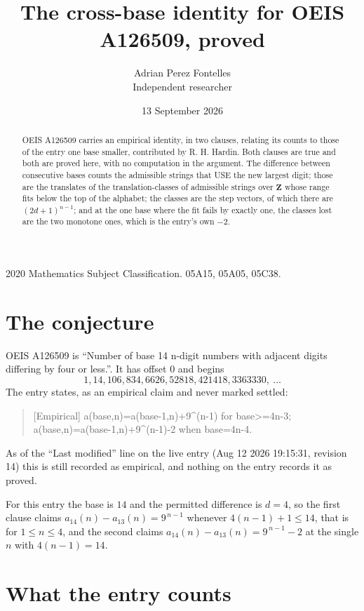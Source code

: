 \documentclass[11pt,a4paper]{article}
\title{The cross-base identity for OEIS A126509, proved}
\author{Adrian Perez Fontelles\\ \small Independent researcher}
\date{13 September 2026}
\theoremstyle{plain}
\theoremstyle{definition}
\begin{document}
\maketitle

\begin{abstract}
OEIS A126509 carries an empirical identity, in two clauses, relating its counts to those of the
entry one base smaller, contributed by R. H. Hardin. Both clauses are true and both are proved
here, with no computation in the argument. The difference between consecutive bases counts the
admissible strings that USE the new largest digit; those are the translates of the
translation-classes of admissible strings over $\mathbf{Z}$ whose range fits below the top of
the alphabet; the classes are the step vectors, of which there are $(2d+1)^{n-1}$; and at the
one base where the fit fails by exactly one, the classes lost are the two monotone ones, which
is the entry's own $-2$.
\end{abstract}

\noindent\small 2020 Mathematics Subject Classification. 05A15, 05A05, 05C38.\normalsize

\section{The conjecture}

OEIS A126509 is ``Number of base 14 n-digit numbers with adjacent digits differing by four or less.''. It has offset $0$ and begins
\[
1, 14, 106, 834, 6626, 52818, 421418, 3363330,\ \dots
\]
The entry states, as an empirical claim and never marked settled:
\begin{quote}
[Empirical] a(base,n)=a(base-1,n)+9\textasciicircum{}(n-1) for base>=4n-3; a(base,n)=a(base-1,n)+9\textasciicircum{}(n-1)-2 when base=4n-4.
\end{quote}
As of the ``Last modified'' line on the live entry (Aug 12 2026 19:15:31, revision 14)
this is still recorded as empirical, and nothing on the entry records it as proved.

For this entry the base is $14$ and the permitted difference is $d=4$, so the first clause
claims $a_{14}(n)-a_{13}(n)=9^{\,n-1}$ whenever $4(n-1)+1\le14$, that is for
$1\le n\le4$, and the second claims $a_{14}(n)-a_{13}(n)=9^{\,n-1}-2$ at the single
$n$ with $4(n-1)=14$.

\section{What the entry counts}
\end{document}
